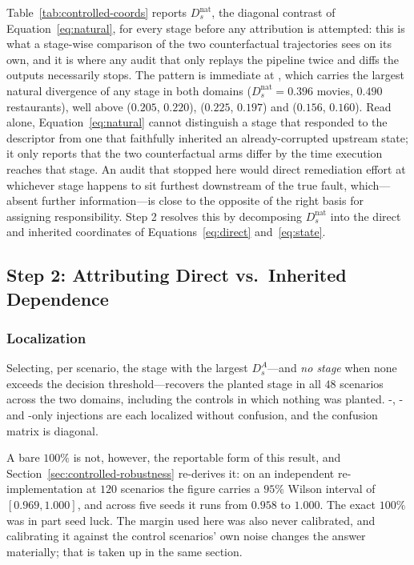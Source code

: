 Table~\ref{tab:controlled-coords} reports $D_s^{\mathrm{nat}}$, the diagonal contrast of
Equation~\eqref{eq:natural}, for every stage before any attribution is attempted: this is what a
stage-wise comparison of the two counterfactual trajectories sees on its own, and it is where any
audit that only replays the pipeline twice and diffs the outputs necessarily stops. The pattern is
immediate at , which carries the largest natural divergence of any stage in both
domains ($D_s^{\mathrm{nat}} = 0.396$ movies, $0.490$ restaurants), well above 
($0.205$, $0.220$),  ($0.225$, $0.197$) and  ($0.156$, $0.160$). Read
alone, Equation~\eqref{eq:natural} cannot distinguish a stage that responded to the descriptor
from one that faithfully inherited an already-corrupted upstream state; it only reports that the
two counterfactual arms differ by the time execution reaches that stage. An audit that stopped
here would direct remediation effort at whichever stage happens to sit furthest downstream of the
true fault, which---absent further information---is close to the opposite of the right basis for
assigning responsibility. Step 2 resolves this by decomposing $D_s^{\mathrm{nat}}$ into the direct
and inherited coordinates of Equations~\eqref{eq:direct} and~\eqref{eq:state}.

\subsection{Step 2: Attributing Direct vs.\ Inherited Dependence}
\label{sec:controlled-step2}

\subsubsection{Localization}
\label{sec:rq1}

Selecting, per scenario, the stage with the largest $D_s^{A}$---and \emph{no stage} when none
exceeds the decision threshold---recovers the planted stage in all $48$ scenarios across the two
domains, including the controls in which nothing was planted. -, -
and -only injections are each localized without confusion, and the confusion matrix
is diagonal.

A bare $100\%$ is not, however, the reportable form of this result, and
Section~\ref{sec:controlled-robustness} re-derives it: on an independent re-implementation at
$120$ scenarios the figure carries a $95\%$ Wilson interval of $[0.969, 1.000]$, and across five
seeds it runs from $0.958$ to $1.000$. The exact $100\%$ was in part seed luck. The margin used
here was also never calibrated, and calibrating it against the control scenarios' own noise
changes the answer materially; that is taken up in the same section.

